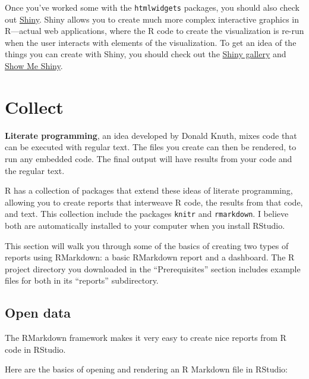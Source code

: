 \documentclass[]{tufte-book}
\begin{document}
Once you've worked some with the \texttt{htmlwidgets} packages, you should also check out
\href{https://shiny.rstudio.com/}{Shiny}. Shiny allows you to create much more complex
interactive graphics in R---actual
web applications, where the R code to create the visualization is re-run when the user
interacts with elements of the visualization. To get an idea of the things you can
create with Shiny, you should check out the \href{https://shiny.rstudio.com/gallery/}{Shiny gallery}
and \href{https://www.showmeshiny.com/}{Show Me Shiny}.

\hypertarget{collect}{%
\chapter{Collect}\label{collect}}

\textbf{Literate programming}, an idea developed by Donald Knuth, mixes code that can be executed with
regular text. The files you create can then be rendered, to run any embedded code. The final output
will have results from your code and the regular text.

R has a collection of packages that extend these ideas of literate programming, allowing you to
create reports that interweave R code, the results from that code, and text. This collection
include the packages \texttt{knitr} and \texttt{rmarkdown}. I believe both are automatically installed to your
computer when you install RStudio.

This section will walk you through some of the basics of creating two types of reports using
RMarkdown: a basic RMarkdown report and a dashboard. The R project directory you downloaded in
the ``Prerequisites'' section includes example files for both in its ``reports'' subdirectory.

\hypertarget{open-data}{%
\section{Open data}\label{open-data}}

The RMarkdown framework makes it very easy to create nice reports from R code in RStudio.

Here are the basics of opening and rendering an R Markdown file in RStudio:
\end{document}
